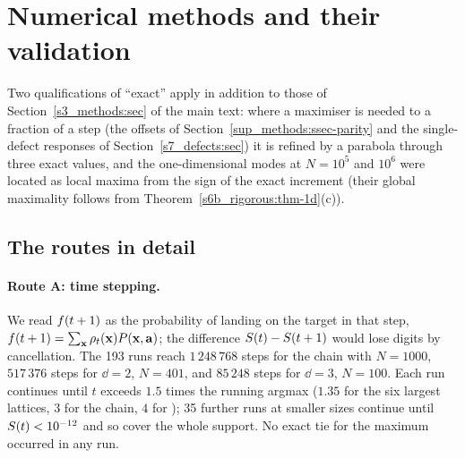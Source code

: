 \section{Numerical methods and their validation}\label{sup_methods:sec}

Two qualifications of ``exact'' apply in addition to those of Section~\ref{s3_methods:sec} of the main text: where a
maximiser is needed to a fraction of a step (the offsets of Section~\ref{sup_methods:ssec-parity} and the
single-defect responses of Section~\ref{s7_defects:sec}) it is refined by a parabola through three exact values, and
the one-dimensional modes at $N=10^{5}$ and $10^{6}$ were located as local maxima from the sign of the exact
increment (their global maximality follows from Theorem~\ref{s6b_rigorous:thm-1d}(c)).

\subsection{The routes in detail}

\paragraph{Route A: time stepping.}
We read $f(t+1)$ as the probability of landing on the target in that step, $f(t+1)=\sum_{\mathbf{x}}\rho_t(\mathbf{x})P(\mathbf{x},\mathbf{a})$;
the difference $S(t)-S(t+1)$ would lose digits by cancellation. The 193 runs reach $1\,248\,768$ steps for the
chain with $N=1000$, $517\,376$ steps for $\dd=2$, $N=401$, and $85\,248$ steps for $\dd=3$, $N=100$.
Each run continues until $t$ exceeds $1.5$ times the running argmax ($1.35$ for the six largest lattices, $3$ for
the chain, $4$ for \EXIT); 35 further runs at smaller sizes continue until $S(t)<10^{-12}$ and so cover the whole
support. No exact tie for the maximum occurred in any run.

